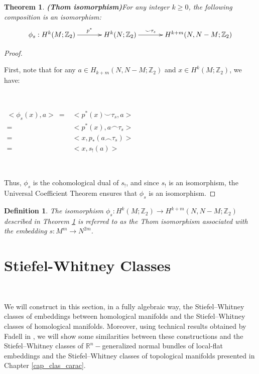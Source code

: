 \documentclass[12pt,oneside]{book}
\newtheorem{defi}   {Definition}[chapter]
\newtheorem{teo}    {Theorem}[chapter]
\newcommand{\R}{\mathbb{R}}
\newcommand{\Z}{\mathbb{Z}}
\newcommand{\ccup}{\smile}
\newcommand{\ccap}{\frown}
\begin{document}
    \begin{teo}{\bf (Thom isomorphism)}\label{iso_thom_vg}
        For any integer $k \geq 0$, the following composition is an isomorphism:
        $$ \xymatrix @C=0.5cm {
        	\phi_{s}: H^{k}(M; \Z_{2}) \ar[rr]^-{p^{*}} && H^{k}(N; \Z_{2}) \ar[rr]^-{\ccup \tau_{s}} && H^{k + m}(N, N - M; \Z_{2})
        } $$
    \end{teo}

    \begin{proof}

        \

        First, note that for any $a \in H_{k + m}(N, N - M; \Z_{2})$ and $x \in H^{k}(M; \Z_{2})$, we have:

        \

        $\begin{array}{rl}
        	<\phi_{s}(x), a> \ = & <p^{*}(x) \ccup \tau_{s}, a> \\
        	= & <p^{*}(x), a \ccap \tau_{s}> \\
        	= & <x, p_{*}(a \ccap \tau_{s})> \\
        	= & <x, s_{!}(a)>
        \end{array}$

        \

        Thus, $\phi_{s}$ is the cohomological dual of $s_{!}$, and since $s_{!}$ is an isomorphism, the Universal Coefficient 
        Theorem ensures that $\phi_{s}$ is an isomorphism.

    \end{proof}

    \begin{defi}
        The isomorphism $\phi_{s}: H^{k}(M; \Z_{2}) \to H^{k + m}(N, N - M; \Z_{2})$ described in Theorem \ref{iso_thom_vg} is referred to as the 
        Thom isomorphism associated with the embedding $s: M^{m} \to N^{2m}$.
    \end{defi}
    


    \section{Stiefel-Whitney Classes}\label{sec_SW_gen}

    \

    We will construct in this section, in a fully algebraic way, the Stiefel–Whitney classes of embeddings 
    between homological manifolds and the Stiefel–Whitney classes of homological manifolds. Moreover, using 
    technical results obtained by Fadell in \cite{fadell_1}, we will show some similarities between these constructions and the Stiefel–Whitney 
    classes of $\R^{n}-$generalized normal bundles of local-flat embeddings and 
    the Stiefel–Whitney classes of topological manifolds presented in Chapter \ref{cap_clas_carac}.
\end{document}
